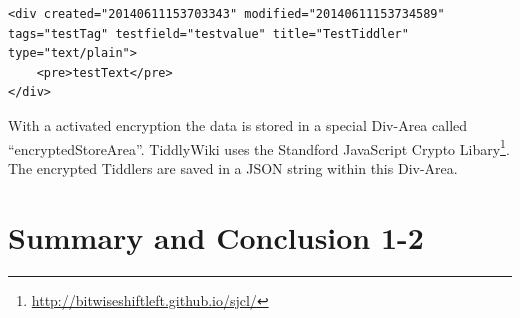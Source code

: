 \documentclass[12pt,a4paper]{article}
\begin{document}
\begin{lstlisting}[caption={Data-Div},label=lst:data-div]
<div created="20140611153703343" modified="20140611153734589" tags="testTag" testfield="testvalue" title="TestTiddler" type="text/plain">
	<pre>testText</pre>
</div>
\end{lstlisting}
With a activated encryption the data is stored in a special Div-Area called ``encryptedStoreArea''. TiddlyWiki uses the Standford JavaScript Crypto Libary\footnote{\url{http://bitwiseshiftleft.github.io/sjcl/}}. The encrypted Tiddlers are saved in a JSON string within this Div-Area.
\section{Summary and Conclusion 1-2}


\end{document}
